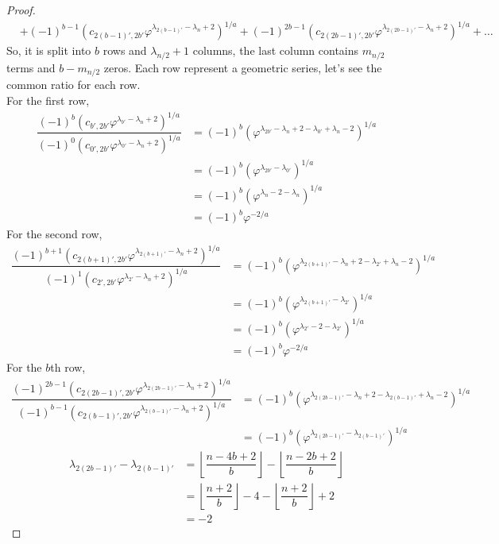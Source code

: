 \documentclass[preprint,12pt]{elsarticle}
\begin{document}
\begin{proof}
\begin{align*}
		&+(-1)^{b-1}(c_{2(b-1)',2b'}\varphi^{\lambda_{2(b-1)'}-\lambda_{n}+2})^{1/a}+(-1)^{2b-1}(c_{2(2b-1)',2b'}\varphi^{\lambda_{2(2b-1)'}-\lambda_{n}+2})^{1/a}+\ldots
	\end{align*}  
	\clearpage
	So, it is split into $b$ rows and $\lambda_{n/2} + 1$ columns, the last column contains $m_{n/2}$ terms and $b - m_{n/2}$ zeros. Each row represent a geometric series, let's see the common ratio for each row.\\
	For the first row,
	\begin{align*}
		\dfrac{(-1)^{b}(c_{b',2b'}\varphi^{\lambda_{b'}-\lambda_{n}+2})^{1/a}}{(-1)^0(c_{0',2b'}\varphi^{\lambda_{0'}-\lambda_{n}+2})^{1/a}} &= (-1)^b\left(\varphi^{\lambda_{2b'}-\lambda_{n}+2-\lambda_{0'}+\lambda_{n}-2}\right)^{1/a}\\
		&= (-1)^b\left(\varphi^{\lambda_{2b'}-\lambda_{0'}}\right)^{1/a}\\
		&= (-1)^b\left(\varphi^{\lambda_{n}-2-\lambda_{n}}\right)^{1/a}\\
		&=(-1)^b \varphi^{-2/a}
	\end{align*}
	For the second row,
	\begin{align*}
		\dfrac{(-1)^{b+1}(c_{2(b+1)',2b'}\varphi^{\lambda_{2(b+1)'}-\lambda_{n}+2})^{1/a}}{(-1)^{1}(c_{2',2b'}\varphi^{\lambda_{2'}-\lambda_{n}+2})^{1/a}} &= (-1)^b\left(\varphi^{\lambda_{2(b+1)'}-\lambda_{n}+2-\lambda_{2'}+\lambda_{n}-2}\right)^{1/a}\\
		&= (-1)^b\left(\varphi^{\lambda_{2(b+1)'}-\lambda_{2'}}\right)^{1/a}\\
		&= (-1)^b\left(\varphi^{\lambda_{2'}-2-\lambda_{2'}}\right)^{1/a}\\
		&=(-1)^b \varphi^{-2/a}
	\end{align*}
	For the $b$th row,
	\begin{align*}
	\dfrac{(-1)^{2b-1}(c_{2(2b-1)',2b'}\varphi^{\lambda_{2(2b-1)'}-\lambda_{n}+2})^{1/a}}{(-1)^{b-1}(c_{2(b-1)',2b'}\varphi^{\lambda_{2(b-1)'}-\lambda_{n}+2})^{1/a}} &= (-1)^b\left(\varphi^{\lambda_{2(2b-1)'}-\lambda_{n}+2-\lambda_{2(b-1)'}+\lambda_{n}-2}\right)^{1/a}\\
	&= (-1)^b\left(\varphi^{\lambda_{2(2b-1)'}-\lambda_{2(b-1)'}}\right)^{1/a}
	\end{align*}
	\begin{align*}
		\lambda_{2(2b-1)'}-\lambda_{2(b-1)'} &= \left\lfloor\dfrac{n-4b+2}{b}\right\rfloor-\left\lfloor\dfrac{n-2b+2}{b}\right\rfloor\\&=\left\lfloor\dfrac{n+2}{b}\right\rfloor-4-\left\lfloor\dfrac{n+2}{b}\right\rfloor+2\\ &= -2

\end{align*}
\end{proof}
\end{document}
